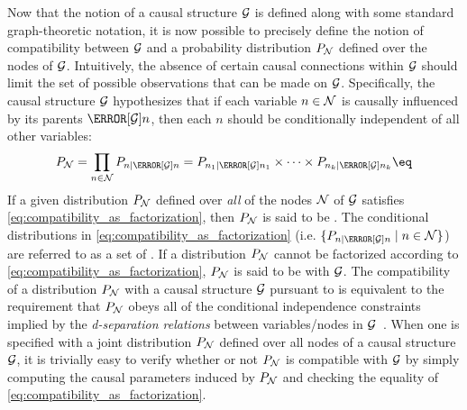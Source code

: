 \documentclass[aps, 10pt, english, twoside, pra, nofootinbib, tightenlines, longbibliography, superscriptaddress]{revtex4-1}
\begin{document}
    Now that the notion of a causal structure $\mathcal{G}$ is defined along with some standard graph-theoretic notation, it is now possible to precisely define the notion of compatibility between $\mathcal{G}$ and a probability distribution $\prob[\nodes]$ defined over the nodes of $\mathcal{G}$. Intuitively, the absence of certain causal connections within $\mathcal{G}$ should limit the set of possible observations that can be made on $\mathcal{G}$. Specifically, the causal structure $\mathcal{G}$ hypothesizes that if each variable $n \in \mathcal{N}$ is causally influenced by its parents $\Pa[\graph]{n}$, then each $n$ should be conditionally independent of all other variables:
    \[ \prob[\nodes] = \prod_{n \in \nodes} \prob[n \mid \Pa[\graph]{n}] = \prob[n_1 \mid \Pa[\graph]{n_1}] \times \cdots \times \prob[n_k \mid \Pa[\graph]{n_k}] \eq \label{eq:compatibility_as_factorization}\]
    If a given distribution $\prob[\nodes]$ defined over \textit{all} of the nodes $\mathcal{N}$ of $\mathcal{G}$ satisfies \cref{eq:compatibility_as_factorization}, then $\prob[\nodes]$ is said to be . The conditional distributions in \cref{eq:compatibility_as_factorization} (i.e. $\{\prob[n \mid \Pa[\graph]{n}] \mid n \in \nodes\}$) are referred to as a set of . If a distribution $\prob[\nodes]$ cannot be factorized according to \cref{eq:compatibility_as_factorization}, $\prob[\nodes]$ is said to be  with $\mathcal{G}$. The compatibility of a distribution $\prob[\nodes]$ with a causal structure $\mathcal{G}$ pursuant to  is equivalent to the requirement that $\prob[\nodes]$ obeys all of the conditional independence constraints implied by the \textit{d-separation relations} between variables/nodes in $\mathcal{G}$~\cite{Pearl_2009}. When one is specified with a joint distribution $\prob[\nodes]$ defined over all nodes of a causal structure $\mathcal{G}$, it is trivially easy to verify whether or not $\prob[\nodes]$ is compatible with $\mathcal{G}$ by simply computing the causal parameters induced by $\prob[\nodes]$ and checking the equality of \cref{eq:compatibility_as_factorization}.
\end{document}
